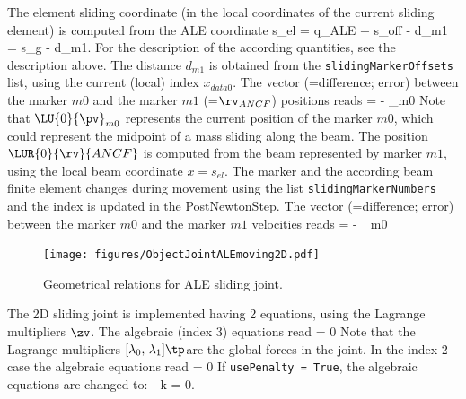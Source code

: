     The element sliding coordinate (in the local coordinates of the current sliding element) is computed from the ALE coordinate
    \be
      s_{el} = q_{ALE} + s_{off} - d_{m1} = s_g - d_{m1}.
    \ee
		For the description of the according quantities, see the description above. The distance $d_{m1}$ is obtained from the \texttt{slidingMarkerOffsets} list, using the current (local) index $x_{data0}$.
    The vector (=difference; error) between the marker $m0$ and the marker $m1$ (=$\rv_{ANCF}$) positions reads
    \be
       =  - _{m0}
    \ee
		Note that $\LU{0}{\pv}_{m0}$ represents the current position of the marker $m0$, which could represent the midpoint of a mass sliding along the beam.
		The position $\LUR{0}{\rv}{ANCF}$ is computed from the beam represented by marker $m1$, using the local beam coordinate $x=s_{el}$. The marker and the according beam finite element changes during movement using the list \texttt{slidingMarkerNumbers } and the index is updated in the PostNewtonStep.
    The vector (=difference; error) between the marker $m0$ and the marker $m1$ velocities reads
    \be
       =  - _{m0}
    \ee
%
		\begin{figure}[tbh]
		\label{fig:ObjectJointALEmoving2D}
    \begin{center}
        \texttt{[image: figures/ObjectJointALEmoving2D.pdf]}
    \end{center}
		\caption{Geometrical relations for ALE sliding joint.}
		\end{figure}
    The 2D sliding joint is implemented having 2 equations, using the Lagrange multipliers $\zv$. 
    The algebraic (index 3) equations read
    \be
       = 0
    \ee
    Note that the Lagrange multipliers $[\lambda_0,\,\lambda_1]\tp$are the global forces in the joint.
    In the index 2 case the algebraic equations read
    \be
       = 0
    \ee
    If \texttt{usePenalty = True}, the algebraic equations are changed to:
    \be
       -  k \zv = 0.
    \ee
%

